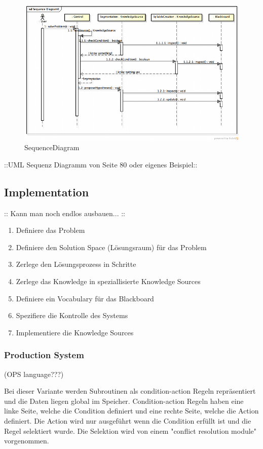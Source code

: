 \begin{figure}[H]
	\centering
	\includegraphics[width=\textwidth]{content/posa1/images/blackboard-sequence.png}
	\caption{SequenceDiagram}
\end{figure}

::UML Sequenz Diagramm von Seite 80 oder eigenes Beispiel::


\subsection*{Implementation}

:: Kann man noch endlos ausbauen... ::

\begin{enumerate}
	\item Definiere das Problem
	\item Definiere den Solution Space (Lösungsraum) für das Problem
	\item Zerlege den Lösungsprozess in Schritte
	\item Zerlege das Knowledge in speziallisierte Knowledge Sources
	\item Definiere ein Vocabulary für das Blackboard
	\item Spezifiere die Kontrolle des Systems
	\item Implementiere die Knowledge Sources
\end{enumerate}


\subsubsection*{Production System}


(OPS language???)

Bei dieser Variante werden Subroutinen als condition-action Regeln repräsentiert und die Daten liegen global im Speicher. Condition-action Regeln haben eine linke Seite, welche die Condition definiert und eine rechte Seite, welche die Action definiert. Die Action wird nur ausgeführt wenn die Condition erfüllt ist und die Regel selektiert wurde. Die Selektion wird von einem "conflict resolution module" vorgenommen.

